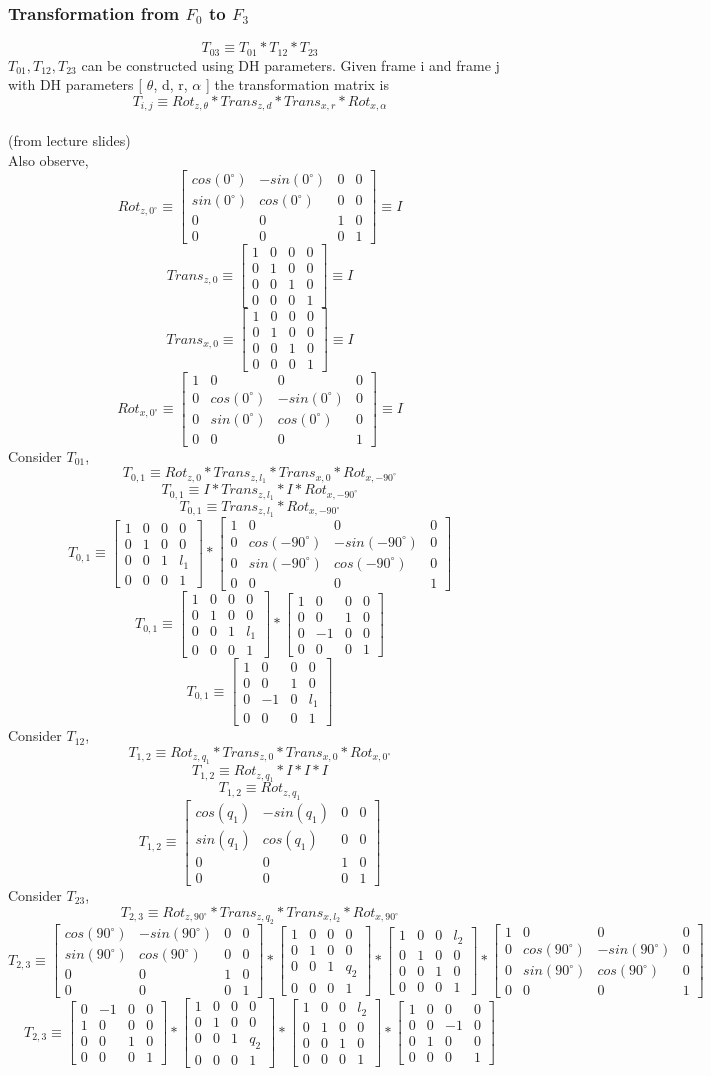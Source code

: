 \documentclass[12pt]{article}
\newcommand{\fromlectures}{{\\ \color{blue} \hspace*{\fill}(from lecture slides)} \\}
\newcommand{\rx}[1]{\begin{bmatrix} 1 & 0 & 0 & 0 \\ 0 & cos(#1) & -sin(#1) & 0 \\ 0 & sin(#1) & cos(#1) & 0 \\ 0 & 0 & 0 & 1 \end{bmatrix}}
\newcommand{\rz}[1]{\begin{bmatrix} cos(#1) & -sin(#1) & 0 & 0 \\ sin(#1) & cos(#1) & 0 & 0 \\ 0 & 0 & 1 & 0 \\ 0 & 0 & 0 & 1 \end{bmatrix}}
\newcommand{\trans}[3]{\begin{bmatrix} 1 & 0 & 0 & #1 \\ 0 & 1 & 0 & #2 \\ 0 & 0 & 1 & #3 \\ 0 & 0 & 0 & 1 \end{bmatrix}}
\begin{document}
\subsubsection*{Transformation from $F_0$ to $F_3$}
\[
  T_{03} \equiv
  T_{01}
  * T_{12}
  * T_{23}
\]
$T_{01}, T_{12}, T_{23}$ can be constructed using DH parameters.
Given frame i and frame j with DH parameters [ $\theta$, d, r, $\alpha$ ] the transformation matrix is
\[
  T_{i,j} \equiv Rot_{z,\theta} * Trans_{z, d} * Trans_{x, r} * Rot_{x, \alpha}
\]
\fromlectures
Also observe,
\[
  Rot_{z, 0^{\circ}} \equiv \rz{0^{\circ}} \equiv I
\]
\[
  Trans_{z, 0} \equiv \trans{0}{0}{0} \equiv I
\]
\[
  Trans_{x, 0} \equiv \trans{0}{0}{0} \equiv I
\]
\[
  Rot_{x, 0^{\circ}} \equiv \rx{0^{\circ}} \equiv I
\]
Consider $T_{01}$,
\[
  T_{0,1} \equiv Rot_{z, 0} * Trans_{z, l_1} * Trans_{x, 0} * Rot_{x, -90^{\circ}}
\]
\[
  T_{0,1} \equiv I * Trans_{z, l_1} * I * Rot_{x, -90^{\circ}}
\]
\[
  T_{0,1} \equiv Trans_{z, l_1} * Rot_{x, -90^{\circ}}
\]
\[
  T_{0,1} \equiv \trans{0}{0}{l_1} * \rx{-90^{\circ}}
\]
\[
  T_{0,1} \equiv \trans{0}{0}{l_1} *
  \begin{bmatrix} 1 & 0 & 0 & 0 \\ 0 & 0 & 1 & 0 \\ 0 & -1 & 0 & 0 \\ 0 & 0 & 0 & 1 \end{bmatrix}
\]
\[
  T_{0,1} \equiv
  \begin{bmatrix} 1 & 0 & 0 & 0 \\ 0 & 0 & 1 & 0 \\ 0 & -1 & 0 & l_1 \\ 0 & 0 & 0 & 1 \end{bmatrix}
\]
Consider $T_{12}$,
\[
  T_{1,2} \equiv Rot_{z, q_1} * Trans_{z, 0} * Trans_{x, 0} * Rot_{x, 0^{\circ}}
\]
\[
  T_{1,2} \equiv Rot_{z, q_1} * I * I * I
\]
\[
  T_{1,2} \equiv Rot_{z, q_1}
\]
\[
  T_{1,2} \equiv \rz{q_1}
\]
Consider $T_{23}$,
\[
  T_{2,3} \equiv Rot_{z, 90^{\circ}} * Trans_{z, q_2} * Trans_{x, l_2} * Rot_{x, 90^{\circ}}
\]
\[
  T_{2,3} \equiv \rz{90^{\circ}} * \trans{0}{0}{q_2} * \trans{l_2}{0}{0} * \rx{90^{\circ}}
\]
\[
  T_{2,3}
  \equiv
  \begin{bmatrix} 0 & -1 & 0 & 0 \\ 1 & 0 & 0 & 0 \\ 0 & 0 & 1 & 0 \\ 0 & 0 & 0 & 1 \end{bmatrix}
  * \trans{0}{0}{q_2}
  * \trans{l_2}{0}{0}
  * \begin{bmatrix} 1 & 0 & 0 & 0 \\ 0 & 0 & -1 & 0 \\ 0 & 1 & 0 & 0 \\ 0 & 0 & 0 & 1 \end{bmatrix}
\]
\end{document}
